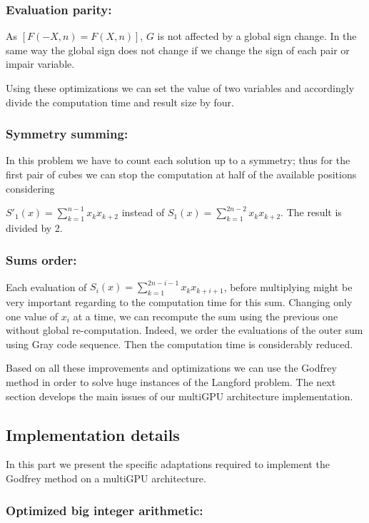 \subsubsection{Evaluation parity: }
As $[F(-X,n) = F(X,n)]$, $G$ is not affected by a global sign change. 
In the same way the global sign does not change if we change the sign of each pair or impair variable.

Using these optimizations we can set the value of two variables and accordingly divide the computation time and result size by four.

\subsubsection{Symmetry summing: }
In this problem we have to count each solution up to a symmetry; thus for the first pair of cubes we can stop the computation at half of the available positions considering 

\noindent $S'_1(x) = \sum_{k=1}^{n-1}x_kx_{k+2}$ instead of $S_1(x) = \sum_{k=1}^{2n-2} x_kx_{k+2}$.
The result is divided by 2. 

\subsubsection{Sums order: }
Each evaluation of $ S_i(x) = \sum_{k=1}^{2n-i-1} x_kx_{k+i+1} $, before multiplying might be very important regarding to the computation time for this sum. 
Changing only one value of $ x_i $ at a time, we can recompute the sum using the previous one without global re-computation. 
Indeed, we order the evaluations of the outer sum using Gray code sequence. 
Then the computation time is considerably reduced.  

Based on all these improvements and optimizations we can use the Godfrey method in order to solve huge instances of the Langford problem. 
The next section develops the main issues of our multiGPU architecture implementation. 

\subsection{Implementation details}
In this part we present the specific adaptations required to implement the Godfrey method on a multiGPU architecture.

\subsubsection{Optimized big integer arithmetic: }

